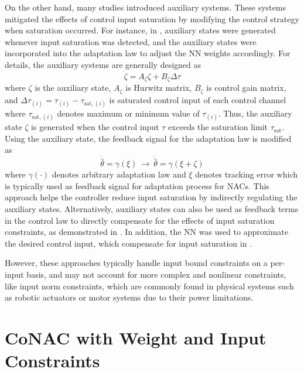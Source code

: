 On the other hand, many studies introduced auxiliary systems. 
These systems mitigated the effects of control input saturation by modifying the control strategy when saturation occurred. 
For instance, in \cite{RN60, RN95, RN46}, auxiliary states were generated whenever input saturation was detected, and the auxiliary states were incorporated into the adaptation law to adjust the NN weights accordingly. 
For details, the auxiliary systems are generally designed as
\begin{equation}
    \dot\zeta = A_\zeta \zeta + B_\zeta \Delta\tau
\end{equation}
where $\zeta$ is the auxiliary state, $A_\zeta$ is Hurwitz matrix, $B_\zeta$ is control gain matrix, and $\Delta\tau_{(i)}=\tau_{(i)}-\tau_{\text{sat},(i)}$ is saturated control input of each control channel where $\tau_{\text{sat},(i)}$ denotes maximum or minimum value of $\tau_{(i)}$.
Thus, the auxiliary state $\zeta$ is generated when the control input $\tau$ exceeds the saturation limit $\tau_{\text{sat}}$.
Using the auxiliary state, the feedback signal for the adaptation law is modified as
\begin{equation}
    \dot{\hat\theta} = \gamma(\xi) 
    \ \to \ 
    \dot{\hat\theta}=\gamma(\xi+\zeta)
\end{equation}
where $\gamma(\cdot)$ denotes arbitrary adaptation law and $\xi$ denotes tracking error which is typically used as feedback signal for adaptation process for NACs.  
This approach helps the controller reduce input saturation by indirectly regulating the auxiliary states.
Alternatively, auxiliary states can also be used as feedback terms in the control law to directly compensate for the effects of input saturation constraints, as demonstrated in \cite{RN89, RN88, RN82}. 
In addition, the NN was used to approximate the desired control input, which compensate for input saturation in \cite{RN18}. 

However, these approaches typically handle input bound constraints on a per-input basis, and may not account for more complex and nonlinear constraints, like input norm constraints, which are commonly found in physical systems such as robotic actuators or motor systems due to their power limitations.

\section{CoNAC with Weight and Input Constraints}

